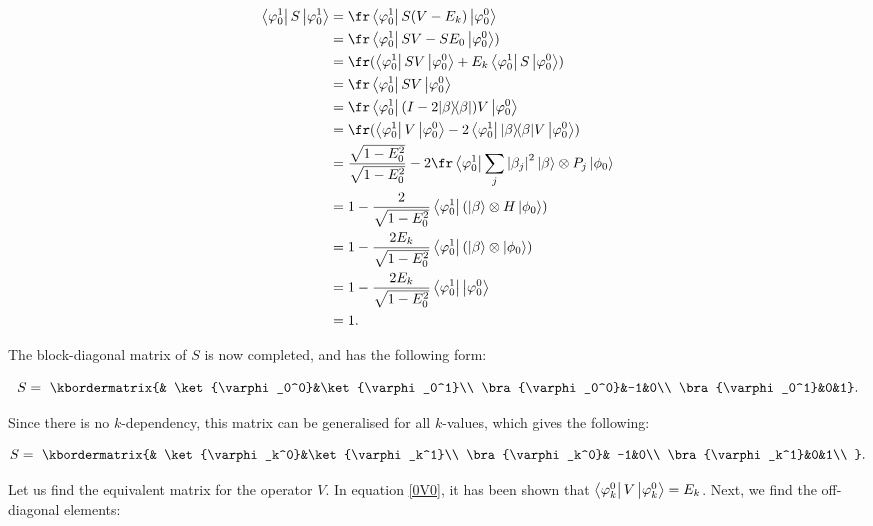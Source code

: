 \begin{align} \begin{split}
\bra{\varphi_0^1}S\ket{\varphi_0^1} &= \fr \bra{\varphi_0^1} S(V-E_k) \ket{\varphi_0^0} \\
&= \fr \bra{\varphi_0^1} SV - S E_0 \ket{\varphi_0^0})\\
&= \fr ( \bra{\varphi_0^1} SV \ket{\varphi_0^0} + E_k \bra{\varphi_0^1} S \ket{\varphi_0^0})\\
&= \fr \bra{\varphi_0^1} SV \ket{\varphi_0^0} \\
&= \fr \bra{\varphi_0^1} (I - 2 \kb \beta \beta) V \ket{\varphi_0^0}\\
&= \fr ( \bra{\varphi_0^1} V \ket{\varphi_0^0} - 2  \bra{\varphi_0^1} \kb \beta \beta V \ket{\varphi_0^0})\\
&= \frac{\sqrt{1-E_0^2}}{\sqrt{1-E_0^2}} - 2 \fr \bra{\varphi_0^1} \sum_j \abs{\beta_j}^2 \ket{\beta} \otimes P_j \ket{\phi_0}\\
&= 1 - \frac{2}{\sqrt{1-E_0^2}} \bra{\varphi_0^1} \left(\ket{\beta} \otimes H \ket{\phi_0}\right)\\
&= 1 - \frac{2E_k}{\sqrt{1-E_0^2}} \bra{\varphi_0^1} \left(\ket{\beta} \otimes \ket{\phi_0}\right)\\
&= 1 - \frac{2E_k}{\sqrt{1-E_0^2}} \bra{\varphi_0^1} \ket{\varphi_0^0}\\
&= 1.
\end{split} \end{align}



The block-diagonal matrix of $S$ is now completed, and has the following form:

\begin{equation}
S = \
\kbordermatrix{& \ket{\varphi_0^0}&\ket{\varphi_0^1}\\
\bra{\varphi_0^0}&-1&0\\
\bra{\varphi_0^1}&0&1}.
\end{equation}

Since there is no $k$-dependency, this matrix can be generalised for all $k$-values, which gives the following:


\begin{equation}
S = \
\kbordermatrix{& \ket{\varphi_k^0}&\ket{\varphi_k^1}\\
\bra{\varphi_k^0}& -1&0\\
\bra{\varphi_k^1}&0&1\\
}.
\end{equation}


Let us find the equivalent matrix for the operator $V$. In equation \ref{0V0}, it has been shown that $\left\langle{\varphi_k^0}\right\vert V \left\vert{\varphi_k^0}\right\rangle = E_k$. Next, we find the off-diagonal elements:

